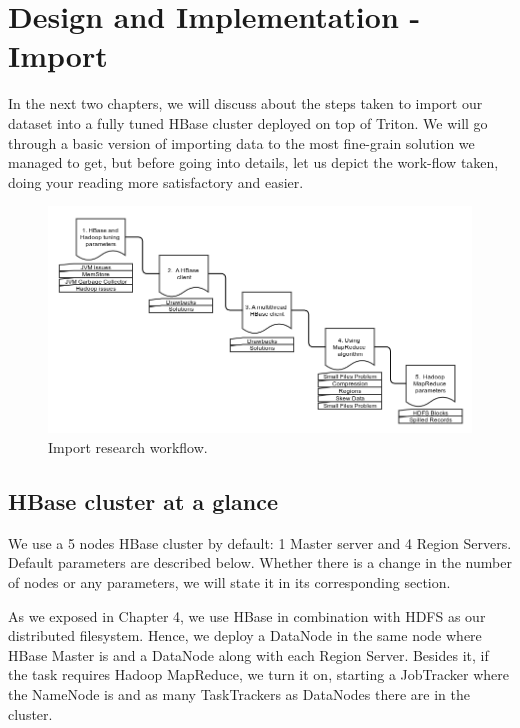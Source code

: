 \chapter{Design and Implementation - Import}
\label{chapter:Design and Implementation - Import}


In the next two chapters, we will discuss about the steps taken to import our dataset into a fully tuned HBase cluster deployed on top of Triton. We will go through a basic version of importing data to the most fine-grain solution we managed to get, but before going into details, let us depict the work-flow taken, doing your reading more satisfactory and easier.


\bigskip
\begin{figure}[htb]
\centering
\includegraphics[width=1\textwidth]{./images/approaches.png}
\caption{Import research workflow.} \label{fig:approaches}
\end{figure}




\section{HBase cluster at a glance}

We use a 5 nodes HBase cluster by default: 1 Master server and 4 Region Servers. Default parameters are described below. Whether there is a change in the number of nodes or any parameters, we will state it in its corresponding section.
\par
As we exposed in Chapter 4, we use HBase in combination with HDFS as our distributed filesystem. Hence, we deploy a DataNode in the same node where HBase Master is and a DataNode along with each Region Server. Besides it, if the task requires Hadoop MapReduce, we turn it on, starting a JobTracker where the NameNode is and as many TaskTrackers as DataNodes there are in the cluster.

